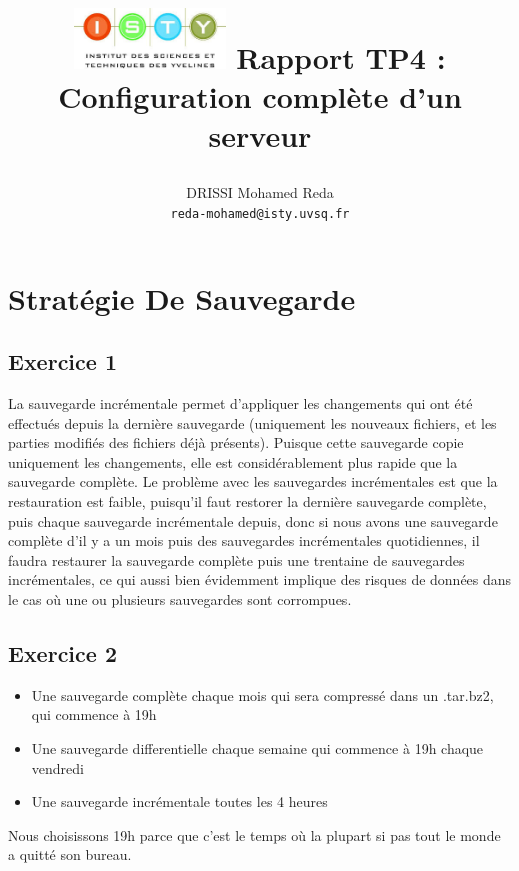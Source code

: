 \documentclass{report}
\begin{document}
\title{
  \begin{minipage}\linewidth
      \centering
      \includegraphics[width=40mm]{resources/01.png}\vskip 20pt
      Rapport TP4 : Configuration complète d'un serveur
      \vskip 5pt
      \author{
        DRISSI Mohamed Reda \\
        \texttt{reda-mohamed@isty.uvsq.fr}
      }
    \end{minipage}
}
\maketitle
\newpage
\tableofcontents
\newpage
\section{Stratégie De Sauvegarde}
\subsection{Exercice 1}
La sauvegarde incrémentale permet d'appliquer les changements qui ont été effectués depuis la
dernière sauvegarde (uniquement les nouveaux fichiers, et les parties modifiés des fichiers déjà
présents). Puisque cette sauvegarde copie uniquement les changements, elle est considérablement
plus rapide que la sauvegarde complète. Le problème avec les sauvegardes incrémentales est que
la restauration est faible, puisqu'il faut restorer la dernière sauvegarde complète, puis
chaque sauvegarde incrémentale depuis, donc si nous avons une sauvegarde complète d'il y a un
mois puis des sauvegardes incrémentales quotidiennes, il faudra restaurer la sauvegarde complète
puis une trentaine de sauvegardes incrémentales, ce qui aussi bien évidemment implique des risques
de données dans le cas où une ou plusieurs sauvegardes sont corrompues.

\subsection{Exercice 2}
\begin{itemize}
  \item Une sauvegarde complète chaque mois qui sera compressé dans un .tar.bz2, qui commence à 19h
  \item Une sauvegarde differentielle chaque semaine qui commence à 19h chaque vendredi
  \item Une sauvegarde incrémentale toutes les 4 heures
\end{itemize}
Nous choisissons 19h parce que c'est le temps où la plupart si pas tout le monde a quitté son bureau.
\end{document}
